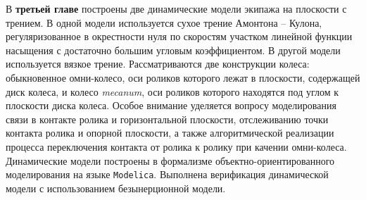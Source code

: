 
В \textbf{третьей главе} построены две динамические модели экипажа на плоскости с трением. В одной модели используется сухое трение Амонтона -- Кулона, регуляризованное в окрестности нуля по скоростям участком линейной функции насыщения с достаточно большим угловым коэффициентом. В другой модели используется вязкое трение. Рассматриваются две конструкции колеса: обыкновенное омни-колесо, оси роликов которого лежат в плоскости, содержащей диск колеса, и колесо \textit{mecanum}, оси роликов которого находятся под углом к плоскости диска колеса. Особое внимание уделяется вопросу моделирования связи в контакте ролика и горизонтальной плоскости, отслеживанию точки контакта ролика и опорной плоскости, а также алгоритмической реализации процесса переключения контакта от ролика к ролику при качении омни-колеса. Динамические модели построены в формализме объектно-ориентированного моделирования на языке \texttt{Modelica}. Выполнена верификация динамической модели с использованием безынерционной модели.

%

